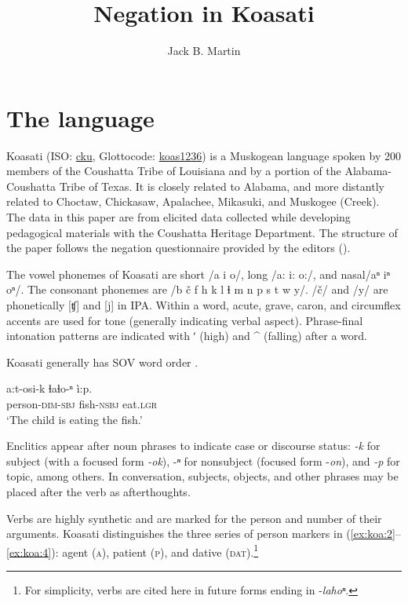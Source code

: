 \documentclass[output=paper,colorlinks,citecolor=brown]{langscibook}
\author{Jack B. Martin\affiliation{William \& Mary}}
\title{Negation in Koasati}
\begin{document}
\maketitle 

\section{The language}\label{sec:koa:1}

Koasati (ISO: \href{https://iso639-3.sil.org/code/cku}{cku}, Glottocode: \href{https://glottolog.org/resource/languoid/id/koas1236}{koas1236}) is a Muskogean language spoken by 200 members of the Coushatta Tribe of Louisiana and by a portion of the Alabama-Coushatta Tribe of Texas. It is closely related to Alabama, and more distantly related to Choctaw, Chickasaw, Apalachee, Mikasuki, and Muskogee (Creek). The data in this paper are from elicited data collected while developing pedagogical materials with the Coushatta Heritage Department. The structure of the paper follows the negation questionnaire provided by the editors ().

The vowel phonemes of Koasati are short /a i o/, long /a: i: o:/, and nasal\linebreak /aⁿ iⁿ oⁿ/.
The consonant phonemes are /b č f h k l ɬ m n p s t w y/. /č/ and /y/ are phonetically [ʧ] and [j] in IPA. Within a word, acute, grave, caron, and circumflex accents are used for tone (generally indicating verbal aspect). Phrase-final intonation patterns are indicated with ʹ (high) and \^{} (falling) after a word.

Koasati generally has SOV word order .

\ea\label{ex:koa:1}
    \gll a:t-osi-k ɬaɬo-ⁿ ì:p. \\
         person-\textsc{dim}-\textsc{sbj} fish-\textsc{nsbj} eat.\textsc{lgr}\\
    \glt ‘The child is eating the fish.’
\z

Enclitics appear after noun phrases to indicate case or discourse status: \textit{-k} for subject (with a focused form \textit{-ok}), -\textit{ⁿ} for nonsubject (focused form -\textit{on}), and \textit{-p} for topic, among others. In conversation, subjects, objects, and other phrases may be placed after the verb as afterthoughts.

Verbs are highly synthetic and are marked for the person and number of their arguments. Koasati distinguishes the three series of person markers in (\ref{ex:koa:2}--\ref{ex:koa:4}): agent (\textsc{a}), patient (\textsc{p}), and dative (\textsc{dat}).\footnote{For simplicity, verbs are cited here in future forms ending in -\textit{lahoⁿ}.}
\end{document}
